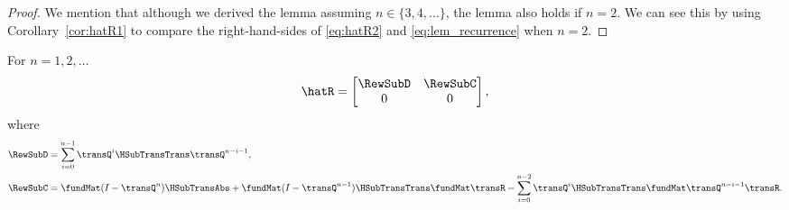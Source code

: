 \begin{proof}
We mention that although we derived the lemma assuming $n \in \{3, 4, \ldots\}$, the lemma also holds if $n=2$.  We can see this by using  Corollary~\ref{cor:hatR1} to compare the right-hand-sides of \eqref{eq:hatR2} and \eqref{eq:lem_recurrence} when $n=2$.

\end{proof}

\begin{myLemma}
	\label{lem:hatRn_matrix}
	For $n = 1, 2, \ldots $
	\begin{equation}
	\label{eq:hatRn_matrix}
		\hatR = 
		\begin{bmatrix}
			\RewSubD & \RewSubC\\
			0 & 0 
		\end{bmatrix},
	\end{equation}	
	where
	\begin{align}
		\label{eq:RewSubDn}
			\RewSubD &= \sum_{i = 0}^{n-1}\transQ^{i}\HSubTransTrans\transQ^{n - i - 1}, \\
		\label{eq:RewSubCn}
			\RewSubC &= \fundMat(I - \transQ^{n})\HSubTransAbs + \fundMat(I - \transQ^{n-1})\HSubTransTrans\fundMat\transR - \sum_{i = 0}^{n-2}\transQ^{i}\HSubTransTrans\fundMat\transQ^{n - i - 1}\transR.
	\end{align}
\end{myLemma}

